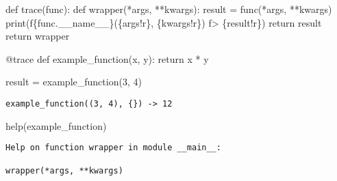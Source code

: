 \documentclass[
]{report}
\newenvironment{Shaded}{\begin{snugshade}}{\end{snugshade}}
\newcommand{\AttributeTok}[1]{\textcolor[rgb]{0.40,0.45,0.13}{#1}}
\newcommand{\BuiltInTok}[1]{\textcolor[rgb]{0.00,0.23,0.31}{#1}}
\newcommand{\ControlFlowTok}[1]{\textcolor[rgb]{0.00,0.23,0.31}{#1}}
\newcommand{\DecValTok}[1]{\textcolor[rgb]{0.68,0.00,0.00}{#1}}
\newcommand{\KeywordTok}[1]{\textcolor[rgb]{0.00,0.23,0.31}{#1}}
\newcommand{\NormalTok}[1]{\textcolor[rgb]{0.00,0.23,0.31}{#1}}
\newcommand{\OperatorTok}[1]{\textcolor[rgb]{0.37,0.37,0.37}{#1}}
\newcommand{\SpecialCharTok}[1]{\textcolor[rgb]{0.37,0.37,0.37}{#1}}
\newcommand{\SpecialStringTok}[1]{\textcolor[rgb]{0.13,0.47,0.30}{#1}}
\newcommand{\VariableTok}[1]{\textcolor[rgb]{0.07,0.07,0.07}{#1}}
\begin{document}
\begin{Shaded}
\begin{Highlighting}[]
\KeywordTok{def}\NormalTok{ trace(func):}
    \KeywordTok{def}\NormalTok{ wrapper(}\OperatorTok{*}\NormalTok{args, }\OperatorTok{**}\NormalTok{kwargs):}
\NormalTok{        result }\OperatorTok{=}\NormalTok{ func(}\OperatorTok{*}\NormalTok{args, }\OperatorTok{**}\NormalTok{kwargs)}
        \BuiltInTok{print}\NormalTok{(}\SpecialStringTok{f\textquotesingle{}}\SpecialCharTok{\{}\NormalTok{func}\SpecialCharTok{.}\VariableTok{\_\_name\_\_}\SpecialCharTok{\}}\SpecialStringTok{(}\SpecialCharTok{\{}\NormalTok{args}\SpecialCharTok{!r\}}\SpecialStringTok{, }\SpecialCharTok{\{}\NormalTok{kwargs}\SpecialCharTok{!r\}}\SpecialStringTok{) \textquotesingle{}}
              \SpecialStringTok{f\textquotesingle{}{-}\textgreater{} }\SpecialCharTok{\{}\NormalTok{result}\SpecialCharTok{!r\}}\SpecialStringTok{\textquotesingle{}}\NormalTok{)}
        \ControlFlowTok{return}\NormalTok{ result}
    \ControlFlowTok{return}\NormalTok{ wrapper}
\end{Highlighting}
\end{Shaded}

\begin{Shaded}
\begin{Highlighting}[]
\AttributeTok{@trace}
\KeywordTok{def}\NormalTok{ example\_function(x, y):}
    \ControlFlowTok{return}\NormalTok{ x }\OperatorTok{*}\NormalTok{ y}

\NormalTok{result }\OperatorTok{=}\NormalTok{ example\_function(}\DecValTok{3}\NormalTok{, }\DecValTok{4}\NormalTok{)}
\end{Highlighting}
\end{Shaded}

\begin{verbatim}
example_function((3, 4), {}) -> 12
\end{verbatim}

\begin{Shaded}
\begin{Highlighting}[]
\BuiltInTok{help}\NormalTok{(example\_function)}
\end{Highlighting}
\end{Shaded}

\begin{verbatim}
Help on function wrapper in module __main__:

wrapper(*args, **kwargs)
\end{verbatim}
\end{document}
